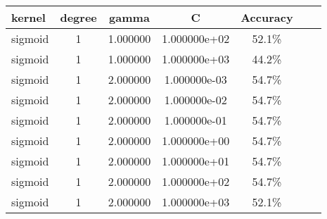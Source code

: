 \documentclass[11pt,spanish,listoffigures,listoftables]{tfgetsinf}
\begin{document}
\begin{table}[t!]
 \begin{tabular}[t!]{l*{5}{c}r}
 kernel & degree & gamma & C & Accuracy\\
 \hline
 sigmoid & 1 & 1.000000 & 1.000000e+02 & 52.1\%\\
 sigmoid & 1 & 1.000000 & 1.000000e+03 & 44.2\%\\
 sigmoid & 1 & 2.000000 & 1.000000e-03 & 54.7\%\\
 sigmoid & 1 & 2.000000 & 1.000000e-02 & 54.7\%\\
 sigmoid & 1 & 2.000000 & 1.000000e-01 & 54.7\%\\
 sigmoid & 1 & 2.000000 & 1.000000e+00 & 54.7\%\\
 sigmoid & 1 & 2.000000 & 1.000000e+01 & 54.7\%\\
 sigmoid & 1 & 2.000000 & 1.000000e+02 & 54.7\%\\
 sigmoid & 1 & 2.000000 & 1.000000e+03 & 52.1\%\\
\end{tabular}
\end{table}

\clearpage
\FloatBarrier
\end{document}
